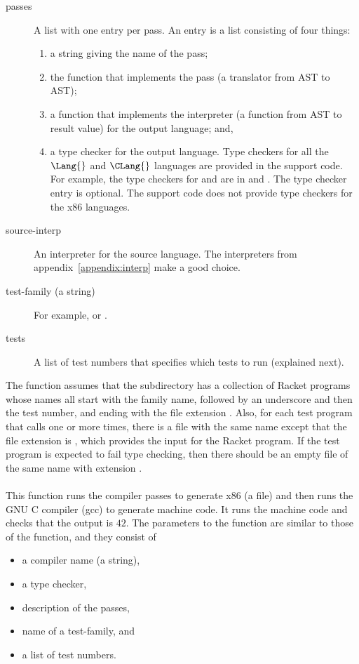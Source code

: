 \documentclass[7x10]{TimesAPriori_MIT}%
\numberwithin{theorem}{chapter}
\numberwithin{definition}{chapter}
\numberwithin{equation}{chapter}
\begin{document}
{\begin{description}
\item[passes] A list with one entry per pass.  An entry is a list
  consisting of four things:
  \begin{enumerate}
  \item a string giving the name of the pass;
  \item the function that implements the pass (a translator from AST
    to AST);
  \item a function that implements the interpreter (a function from
    AST to result value) for the output language; and,
  \item a type checker for the output language.  Type checkers for
    all the $\Lang{}$ and $\CLang{}$ languages are provided in the support code.
    For example, the type checkers for \LangVar{} and \LangCVar{} are in
     and . The
    type checker entry is optional.  The support code does not provide
    type checkers for the x86 languages.
  \end{enumerate}

\item[source-interp] An interpreter for the source language. The
  interpreters from appendix~\ref{appendix:interp} make a good choice.
  
\item[test-family (a string)] For example,   or .
\item[tests] A list of test numbers that specifies which tests to
  run (explained next).
\end{description}
%
The  function assumes that the subdirectory
 has a collection of Racket programs whose names all start
with the family name, followed by an underscore and then the test
number, and ending with the file extension . Also, for each test
program that calls  one or more times, there is a file with
the same name except that the file extension is , which
provides the input for the Racket program. If the test program is
expected to fail type checking, then there should be an empty file of
the same name with extension .


\paragraph{}

This function runs the compiler passes to generate x86 (a 
file) and then runs the GNU C compiler (gcc) to generate machine code.
It runs the machine code and checks that the output is $42$. The
parameters to the  function are similar to those
of the  function, and they consist of
\begin{itemize}
\item a compiler name (a string),
\item a type checker,
\item description of the passes,
\item name of a test-family, and
\item a list of test numbers.
\end{itemize}


}
\end{document}
